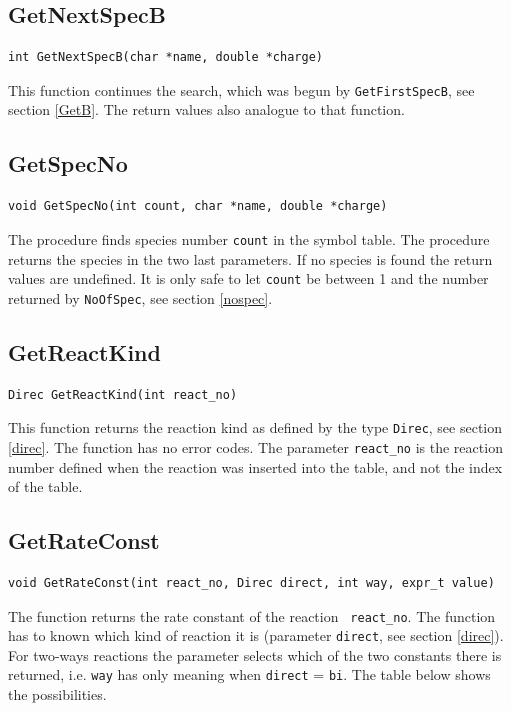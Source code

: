 \subsection{GetNextSpecB}
\begin{verbatim}
int GetNextSpecB(char *name, double *charge)
\end{verbatim}

This function continues the search, which was begun by 
{\tt GetFirstSpecB}, see section \ref{GetB}.
The return values also analogue to that function.

\subsection{GetSpecNo}
\begin{verbatim}
void GetSpecNo(int count, char *name, double *charge)
\end{verbatim}

The procedure finds species number {\tt count} in the symbol table. 
The procedure returns the species in the two last parameters. 
If no species is found the return values are undefined.
It is only safe to let {\tt count} be between 1 and the number
returned by {\tt NoOfSpec}, see section \ref{nospec}.

\subsection{GetReactKind}
\begin{verbatim}
Direc GetReactKind(int react_no)
\end{verbatim}

This function returns the reaction kind as defined by the type 
{\tt Direc}, see section \ref{direc}.
The function has no error codes. The parameter {\tt react{\_}no} is the 
reaction number defined when the reaction was inserted into the table,
and not the index of the table.

\subsection{GetRateConst}
\begin{verbatim}
void GetRateConst(int react_no, Direc direct, int way, expr_t value)
\end{verbatim}

The function returns the rate constant of the reaction {\tt
  react\_no}. 
The function has to known which kind of reaction it is (parameter 
{\tt direct}, see section \ref{direc}). 
For two-ways reactions the parameter selects which of the two
constants there is returned, i.e.
{\tt way} has only meaning when {\tt direct} = {\tt bi}. 
The table below shows the possibilities.

